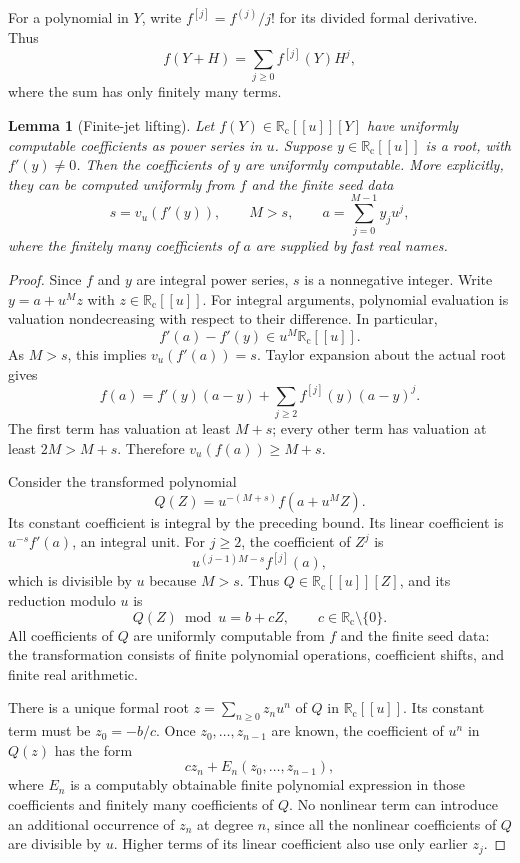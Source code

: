 \documentclass[11pt,letterpaper]{article}
\numberwithin{equation}{section}
\newtheorem{lemma}[theorem]{Lemma}
\theoremstyle{definition}
\theoremstyle{remark}
\newcommand{\Rc}{\mathbb R_{\mathrm c}}
\begin{document}
For a polynomial in $Y$, write $f^{[j]}=f^{(j)}/j!$ for its divided formal
derivative. Thus
\[
 f(Y+H)=\sum_{j\geq0}f^{[j]}(Y)H^j,
\]
where the sum has only finitely many terms.

\begin{lemma}[Finite-jet lifting]
\label{C-lem:finite-jet}
Let $f(Y)\in\Rc[[u]][Y]$ have uniformly computable coefficients as power
series in $u$. Suppose $y\in\Rc[[u]]$ is a root, with
$f'(y)\ne0$. Then the coefficients of $y$ are uniformly computable.
More explicitly, they can be computed uniformly from $f$ and the finite
seed data
\[
 s=v_u(f'(y)),\qquad M>s,\qquad
 a=\sum_{j=0}^{M-1}y_j u^j,
\]
where the finitely many coefficients of $a$ are supplied by fast real names.
\end{lemma}
\begin{proof}
Since $f$ and $y$ are integral power series, $s$ is a nonnegative integer.
Write $y=a+u^Mz$ with $z\in\Rc[[u]]$.
For integral arguments, polynomial evaluation is valuation nondecreasing
with respect to their difference. In particular,
\[
 f'(a)-f'(y)\in u^M\Rc[[u]].
\]
As $M>s$, this implies $v_u(f'(a))=s$.
Taylor expansion about the actual root gives
\[
 f(a)=f'(y)(a-y)+\sum_{j\geq2}f^{[j]}(y)(a-y)^j.
\]
The first term has valuation at least $M+s$; every other term has valuation
at least $2M>M+s$. Therefore $v_u(f(a))\geq M+s$.

Consider the transformed polynomial
\begin{equation}
 Q(Z)=u^{-(M+s)}f(a+u^MZ).
 \label{C-eq:Q-transform}
\end{equation}
Its constant coefficient is integral by the preceding bound. Its linear
coefficient is $u^{-s}f'(a)$, an integral unit. For $j\geq2$, the coefficient
of $Z^j$ is
\[
 u^{(j-1)M-s}f^{[j]}(a),
\]
which is divisible by $u$ because $M>s$. Thus $Q\in\Rc[[u]][Z]$, and its
reduction modulo $u$ is
\begin{equation}
 Q(Z)\bmod u=b+cZ,\qquad c\in\Rc\setminus\{0\}.
 \label{C-eq:Q-mod}
\end{equation}
All coefficients of $Q$ are uniformly computable from $f$ and the finite
seed data: the transformation consists of finite polynomial operations,
coefficient shifts, and finite real arithmetic.

There is a unique formal root $z=\sum_{n\geq0}z_nu^n$ of $Q$ in
$\Rc[[u]]$. Its constant term must be $z_0=-b/c$. Once
$z_0,\ldots,z_{n-1}$ are known, the coefficient of $u^n$ in $Q(z)$ has the
form
\begin{equation}
 c z_n+E_n(z_0,\ldots,z_{n-1}),
 \label{C-eq:triangular}
\end{equation}
where $E_n$ is a computably obtainable finite polynomial expression in those
coefficients and finitely many coefficients of $Q$. No nonlinear term can
introduce an additional occurrence of $z_n$ at degree $n$, since all the
nonlinear coefficients of $Q$ are divisible by $u$. Higher terms of its
linear coefficient also use only earlier $z_j$.


\end{proof}
\end{document}
